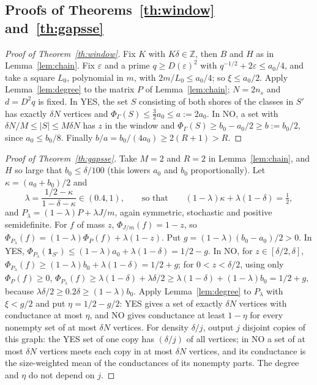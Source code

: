 \documentclass[11pt,letterpaper]{article}
\theoremstyle{definition}
\theoremstyle{remark}
\newcommand{\Z}{\mathbb Z}
\newcommand{\eps}{\varepsilon}
\newcommand{\ind}{\mathbf 1}
\begin{document}
\subsection{Proofs of Theorems~\ref{th:window} and~\ref{th:gapsse}}

\begin{proof}[Proof of Theorem~\ref{th:window}]
Fix \(K\) with \(K\delta\in\Z\), then \(B\) and \(H\) as in
Lemma~\ref{lem:chain}. Fix \(\eps\) and a prime \(q\ge D(\eps)^2\) with
\(q^{-1/2}+2\eps\le a_0/4\), and take a square \(L_0\), polynomial in \(m\),
with \(2m/L_0\le a_0/4\); so \(\xi\le a_0/2\). Apply Lemma~\ref{lem:degree}
to the matrix \(P\) of Lemma~\ref{lem:chain}; \(N=2n_s\) and \(d=D^2q\) is
fixed. In YES, the set \(S\) consisting of both shores of the classes in
\(S'\) has exactly \(\delta N\) vertices and \(\Phi_\Gamma(S)\le
\frac32a_0\le a:=2a_0\). In NO, a set with \(\delta N/M\le|S|\le M\delta N\)
has \(z\) in the window and \(\Phi_\Gamma(S)\ge b_0-a_0/2\ge b:=b_0/2\),
since \(a_0\le b_0/8\). Finally \(b/a=b_0/(4a_0)\ge2(R+1)>R\).
\end{proof}

\begin{proof}[Proof of Theorem~\ref{th:gapsse}]
Take \(M=2\) and \(R=2\) in Lemma~\ref{lem:chain}, and \(H\) so large that
\(b_0\le\delta/100\) (this lowers \(a_0\) and \(b_0\) proportionally). Let
\(\kappa=(a_0+b_0)/2\) and
\[
\lambda=\frac{1/2-\kappa}{1-\delta-\kappa}\in(0.4,1),\qquad\text{so that}\qquad
(1-\lambda)\kappa+\lambda(1-\delta)=\tfrac12,
\]
and \(P_\lambda=(1-\lambda)P+\lambda J/m\), again symmetric, stochastic and
positive semidefinite. For \(f\) of mass \(z\),
\(\Phi_{J/m}(f)=1-z\), so \(\Phi_{P_\lambda}(f)=(1-\lambda)\Phi_P(f)+
\lambda(1-z)\). Put \(g=(1-\lambda)(b_0-a_0)/2>0\). In YES,
\(\Phi_{P_\lambda}(\ind_{S'})\le(1-\lambda)a_0+\lambda(1-\delta)=1/2-g\). In
NO, for \(z\in[\delta/2,\delta]\), \(\Phi_{P_\lambda}(f)\ge(1-\lambda)b_0+
\lambda(1-\delta)=1/2+g\); for \(0<z<\delta/2\), using only
\(\Phi_P(f)\ge0\), \(\Phi_{P_\lambda}(f)\ge\lambda(1-\delta)+\lambda\delta/2
\ge\lambda(1-\delta)+(1-\lambda)b_0=1/2+g\), because
\(\lambda\delta/2\ge0.2\delta\ge(1-\lambda)b_0\). Apply
Lemma~\ref{lem:degree} to \(P_\lambda\) with \(\xi<g/2\) and put
\(\eta=1/2-g/2\): YES gives a set of exactly \(\delta N\) vertices with
conductance at most \(\eta\), and NO gives conductance at least \(1-\eta\)
for every nonempty set of at most \(\delta N\) vertices. For density
\(\delta/j\), output \(j\) disjoint copies of this graph: the YES set of one
copy has \((\delta/j)\) of all vertices; in NO a set of at most
\(\delta N\) vertices meets each copy in at most \(\delta N\) vertices, and
its conductance is the size-weighted mean of the conductances of its
nonempty parts. The degree and \(\eta\) do not depend on \(j\).
\end{proof}
\end{document}

